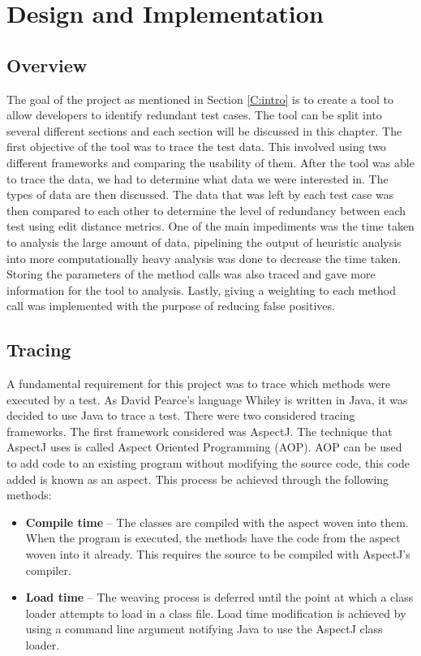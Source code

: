\chapter{Design and Implementation}\label{C:workdone}

\section{Overview}

The goal of the project as mentioned in Section \ref{C:intro} is to create a tool to allow developers to identify redundant test cases. The tool can be split into several different sections and each section will be discussed in this chapter. The first objective of the tool was to trace the test data. This involved using two different frameworks and comparing the usability of them. After the tool was able to trace the data, we had to determine what data we were interested in. The types of data are then discussed. The data that was left by each test case was then compared to each other to determine the level of redundancy between each test using edit distance metrics. One of the main impediments was the time taken to analysis the large amount of data, pipelining the output of heuristic analysis into more computationally heavy analysis was done to decrease the time taken. Storing the parameters of the method calls was also traced and gave more information for the tool to analysis. Lastly, giving a weighting to each method call was implemented with the purpose of reducing false positives.

\section{Tracing}
\label{S:trace}
A fundamental requirement for this project was to trace which methods were executed by a test. As David Pearce's language Whiley is written in Java, it was decided to use Java to trace a test. There were two considered tracing frameworks. The first framework considered was AspectJ. The technique that AspectJ uses is called Aspect Oriented Programming (AOP). AOP can be used to add code to an existing program without modifying the source code, this code added is known as an aspect. This process be achieved through the following methods:

\begin{itemize}
\item \textbf{Compile time} --
The classes are compiled with the aspect woven into them. When the program is executed, the methods have the code from the aspect woven into it already. This requires the source to be compiled with AspectJ's compiler.
\item \textbf{Load time} --
The weaving process is deferred until the point at which a class loader attempts to load in a class file. Load time modification is achieved by using a command line argument notifying Java to use the AspectJ class loader.
\end{itemize}

